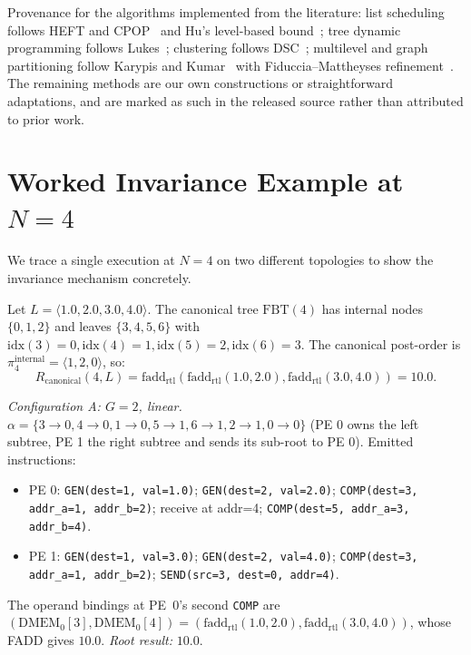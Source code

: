 \documentclass[journal,10pt]{IEEEtran}
\theoremstyle{plain}
\theoremstyle{definition}
\theoremstyle{remark}
\newcommand{\FBT}{\ensuremath{\mathrm{FBT}}}
\newcommand{\fadd}{\ensuremath{\mathrm{fadd}_{\mathrm{rtl}}}}
\newcommand{\Rcan}{\ensuremath{R_{\mathrm{canonical}}}}
\newcommand{\asgn}{\ensuremath{\alpha}}
\begin{document}
\begin{table}[!t]
\caption{Assignment (S2) algorithms by family, with champion-class membership
  across the \TournNInst{} HW-validated instances. $\star$ marks the four
  members of the derived portfolio (\S\ref{sec:selrule}).}
\label{tab:catalogue}
\centering
\footnotesize
\renewcommand{\arraystretch}{1.15}

\end{table}

Provenance for the algorithms implemented from the literature:
list scheduling follows HEFT and CPOP~\cite{topcuoglu2002heft} and Hu's
level-based bound~\cite{hu1961parallel}; tree dynamic programming follows
Lukes~\cite{lukes1974efficient}; clustering follows
DSC~\cite{yang1994dsc}; multilevel and graph partitioning follow
Karypis and Kumar~\cite{karypis1998multilevel} with
Fiduccia--Mattheyses refinement~\cite{fiduccia1982linear}. The remaining
methods are our own constructions or straightforward adaptations, and are
marked as such in the released source rather than attributed to prior work.

\section{Worked Invariance Example at $N = 4$}\label{app:worked}

We trace a single execution at $N = 4$ on two different topologies to
show the invariance mechanism concretely.

Let $L = \langle 1.0, 2.0, 3.0, 4.0\rangle$. The canonical tree
$\FBT(4)$ has internal nodes $\{0,1,2\}$ and leaves $\{3,4,5,6\}$
with $\mathrm{idx}(3)=0, \mathrm{idx}(4)=1, \mathrm{idx}(5)=2,
\mathrm{idx}(6)=3$. The canonical post-order is
$\pi_4^{\text{internal}} = \langle 1, 2, 0\rangle$, so:
\[
\Rcan(4, L) = \fadd(\fadd(1.0, 2.0), \fadd(3.0, 4.0)) = 10.0.
\]

\emph{Configuration A: $G=2$, linear.} $\asgn = \{3\to 0, 4\to 0,
1\to 0, 5\to 1, 6\to 1, 2\to 1, 0\to 0\}$ (PE 0 owns the left subtree,
PE 1 the right subtree and sends its sub-root to PE 0). Emitted
instructions:
\begin{itemize}
\item PE 0: \texttt{GEN(dest=1, val=1.0)}; \texttt{GEN(dest=2, val=2.0)};
  \texttt{COMP(dest=3, addr\_a=1, addr\_b=2)}; receive at addr=4;
  \texttt{COMP(dest=5, addr\_a=3, addr\_b=4)}.
\item PE 1: \texttt{GEN(dest=1, val=3.0)}; \texttt{GEN(dest=2, val=4.0)};
  \texttt{COMP(dest=3, addr\_a=1, addr\_b=2)}; \texttt{SEND(src=3, dest=0, addr=4)}.
\end{itemize}
The operand bindings at PE~0's second \texttt{COMP} are
$(\mathrm{DMEM}_0[3], \mathrm{DMEM}_0[4]) = (\fadd(1.0,2.0),
\fadd(3.0,4.0))$, whose FADD gives $10.0$. \emph{Root result:} $10.0$.
\end{document}
